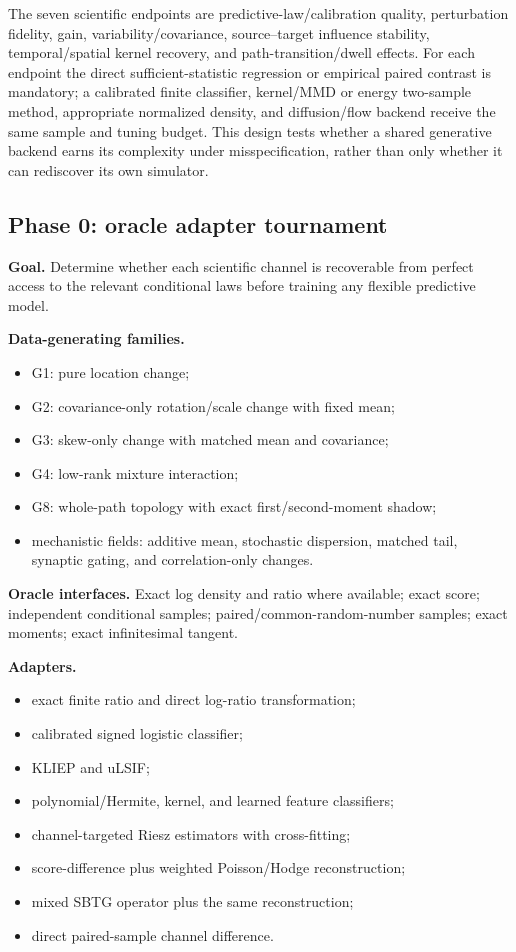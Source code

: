 \documentclass[10pt]{article}
\begin{document}
The seven scientific endpoints are predictive-law/calibration quality,
perturbation fidelity, gain, variability/covariance, source--target influence
stability, temporal/spatial kernel recovery, and path-transition/dwell effects.
For each endpoint the direct sufficient-statistic regression or empirical paired
contrast is mandatory; a calibrated finite classifier, kernel/MMD or energy
two-sample method, appropriate normalized density, and diffusion/flow backend
receive the same sample and tuning budget.  This design tests whether a shared
generative backend earns its complexity under misspecification, rather than only
whether it can rediscover its own simulator.

\subsection{Phase 0: oracle adapter tournament}

\textbf{Goal.} Determine whether each scientific channel is recoverable from perfect access to the relevant conditional laws before training any flexible predictive model.

\textbf{Data-generating families.}

\begin{itemize}
  \item G1: pure location change;
  \item G2: covariance-only rotation/scale change with fixed mean;
  \item G3: skew-only change with matched mean and covariance;
  \item G4: low-rank mixture interaction;
  \item G8: whole-path topology with exact first/second-moment shadow;
  \item mechanistic fields: additive mean, stochastic dispersion, matched tail, synaptic gating, and correlation-only changes.
\end{itemize}

\textbf{Oracle interfaces.} Exact log density and ratio where available; exact score; independent conditional samples; paired/common-random-number samples; exact moments; exact infinitesimal tangent.

\textbf{Adapters.}

\begin{itemize}
  \item exact finite ratio and direct log-ratio transformation;
  \item calibrated signed logistic classifier;
  \item KLIEP and uLSIF;
  \item polynomial/Hermite, kernel, and learned feature classifiers;
  \item channel-targeted Riesz estimators with cross-fitting;
  \item score-difference plus weighted Poisson/Hodge reconstruction;
  \item mixed SBTG operator plus the same reconstruction;
  \item direct paired-sample channel difference.
\end{itemize}
\end{document}
